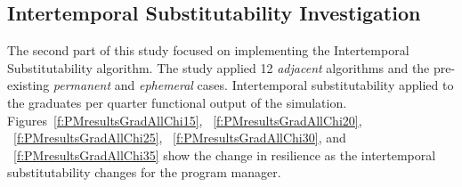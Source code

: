 \documentclass[preprint,12pt]{elsarticle}
\begin{document}

\subsection{Intertemporal Substitutability Investigation}

The second part of this study focused on implementing the
Intertemporal Substitutability algorithm. The study applied 12
\emph{adjacent} algorithms and the pre-existing \emph{permanent} and
\emph{ephemeral} cases. Intertemporal substitutability applied to the
graduates per quarter functional output of the
simulation. Figures~\ref{f:PMresultsGradAllChi15}, ~\ref{f:PMresultsGradAllChi20},
~\ref{f:PMresultsGradAllChi25}, ~\ref{f:PMresultsGradAllChi30}, and
~\ref{f:PMresultsGradAllChi35}  show the change in
resilience as the intertemporal substitutability changes for the
program manager.
\end{document}
